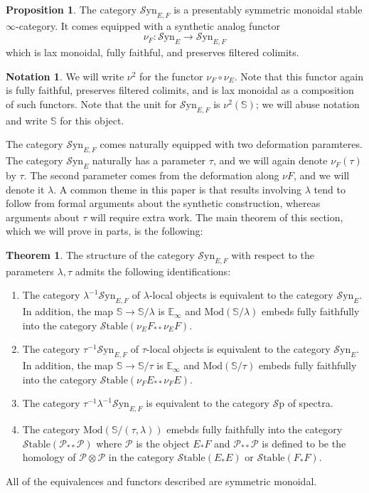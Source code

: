 \documentclass[10pt]{amsart}
\theoremstyle{definition}
\numberwithin{figure}{section}
\numberwithin{equation}{section}
\newtheorem{theorem}[figure]{Theorem}
\newtheorem{proposition}[figure]{Proposition}
\newtheorem{notation}[figure]{Notation}
\newcommand{\cP}{\mathcal{P}}
\theoremstyle{cited}
\newcommand{\bS}{\mathbb{S}}
\newcommand{\bE}{\mathbb{E}}
\newcommand{\Sp}{{\mathcal{S}\mathrm{p}}}
\newcommand{\Mod}{\mathrm{Mod}}
\newcommand{\Syn}{\mathcal{S}\mathrm{yn}}
\newcommand{\Stable}{\mathcal{S}\mathrm{table}}
\begin{document}
\begin{proposition}
  The category $\Syn_{E,F}$ is a presentably symmetric monoidal stable $\infty$-category. It comes equipped with a synthetic analog functor
  \[
  \nu_{F}: \Syn_{E}\to \Syn_{E,F}
  \]
  which is lax monoidal, fully faithful, and preserves filtered colimits. 
\end{proposition}

\begin{notation}
  We will write $\nu^2$ for the functor $\nu_F\circ \nu_E$. Note that this functor again is fully faithful, preserves filtered colimits, and is lax monoidal as a composition of such functors. Note that the unit for $\Syn_{E,F}$ is $\nu^2(\bS)$; we will abuse notation and write $\bS$ for this object.
\end{notation}

The category $\Syn_{E,F}$ comes naturally equipped with two deformation paramteres. The category $\Syn_E$ naturally has a parameter $\tau$, and we will again denote $\nu_{F}(\tau)$ by $\tau$. The second parameter comes from the deformation along $\nu F$, and we will denote it $\lambda$. A common theme in this paper is that results involving $\lambda$ tend to follow from formal arguments about the synthetic construction, whereas arguments about $\tau$ will require extra work. The main theorem of this section, which we will prove in parts, is the following:

\begin{theorem}
  The structure of the category $\Syn_{E,F}$ with respect to the parameters $\lambda, \tau$ admits the following identifications:

  \begin{enumerate}
    \item The category $\lambda^{-1}\Syn_{E,F}$ of $\lambda$-local objects is equivalent to the category $\Syn_E$. In addition, the map $\bS\to \bS/\lambda$ is $\bE_\infty$ and $\Mod(\bS/\lambda)$ embeds fully faithfully into the category $\Stable(\nu_E F_{**}\nu_E F)$.
    \item The category $\tau^{-1}\Syn_{E,F}$ of $\tau$-local objects is equivalent to the category $\Syn_E$. In addition, the map $\bS\to \bS/\tau$ is $\bE_\infty$ and $\Mod(\bS/\tau)$ embeds fully faithfully into the category $\Stable(\nu_F E_{**}\nu_F E)$.
    \item The category $\tau^{-1}\lambda^{-1}\Syn_{E,F}$ is equivalent to the category $\Sp$ of spectra.
    \item The category $\Mod(\bS/(\tau,\lambda))$ emebds fully faithfully into the category $\Stable(\cP_{**}\cP)$ where $\cP$ is the object $E_*F$ and $\cP_{**}\cP$ is defined to be the homology of $\cP\otimes \cP$ in the category $\Stable(E_*E)$ or $\Stable(F_*F)$.
  \end{enumerate}
  All of the equivalences and functors described are symmetric monoidal.
  
\end{theorem}
\end{document}
